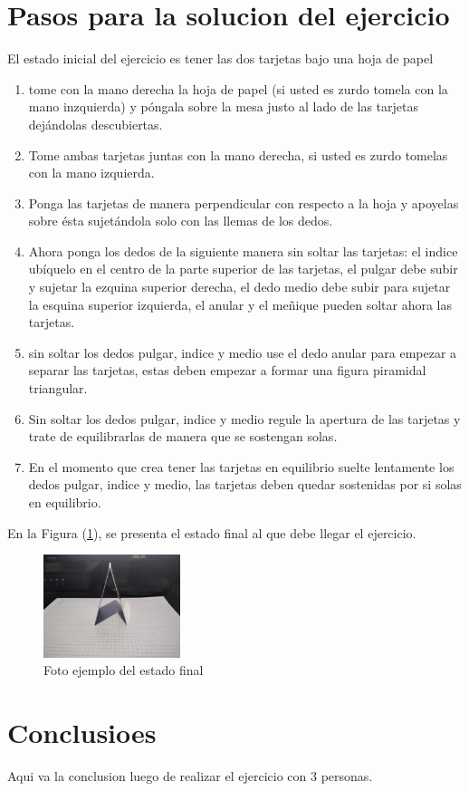 \documentclass{article}
\begin{document}
\section{Pasos para la solucion del ejercicio}
El estado inicial del ejercicio es tener las dos tarjetas bajo una hoja de papel
\begin{enumerate}[1.]
    \item tome con la mano derecha la hoja de papel (si usted es zurdo tomela con la mano inzquierda) y póngala sobre la mesa justo al lado de las tarjetas dejándolas descubiertas. 
    \item Tome ambas tarjetas juntas con la mano derecha, si usted es zurdo tomelas con la mano izquierda. 
    \item Ponga las tarjetas  de manera perpendicular con respecto a la hoja y apoyelas sobre ésta sujetándola solo con las llemas de los dedos.
    \item Ahora ponga los dedos de la siguiente manera sin soltar las tarjetas: el indice ubíquelo en el centro de la parte superior de las tarjetas, el pulgar debe subir y sujetar la ezquina superior derecha, el dedo medio debe subir para sujetar la esquina superior izquierda, el anular y el meñique pueden soltar ahora las tarjetas.
    \item sin soltar los dedos pulgar, indice y medio use el dedo anular para empezar a separar las tarjetas, estas deben empezar a formar una figura piramidal triangular.
    \item Sin soltar los dedos pulgar, indice y medio regule la apertura de las tarjetas y trate de equilibrarlas de manera que se sostengan solas.
    \item En el momento que crea tener las tarjetas en equilibrio suelte lentamente los dedos pulgar, indice y medio, las tarjetas deben quedar sostenidas por si solas en equilibrio. 
\end{enumerate}
En la Figura (\ref{fig:estado-final}), se presenta el estado final al que debe llegar el ejercicio.

\begin{figure}[h]
\includegraphics[width=4cm]{estado-final.jpeg}
\centering
\caption{Foto ejemplo del estado final}
\label{fig:estado-final}
\end{figure}

\newpage
\section{Conclusioes} 

Aqui va la conclusion luego de realizar el ejercicio con 3 personas.
\end{document}

